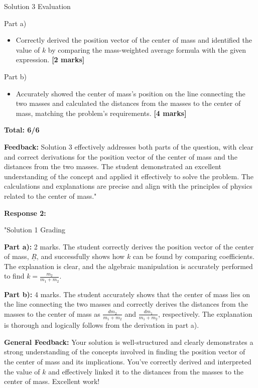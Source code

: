 \documentclass[a4paper,11pt]{article}
\begin{document}
Solution 3 Evaluation

Part a)
\begin{itemize}
    \item Correctly derived the position vector of the center of mass and identified the value of \( k \) by comparing the mass-weighted average formula with the given expression. \textbf{[2 marks]}
\end{itemize}

Part b)
\begin{itemize}
    \item Accurately showed the center of mass's position on the line connecting the two masses and calculated the distances from the masses to the center of mass, matching the problem's requirements. \textbf{[4 marks]}
\end{itemize}

\textbf{Total: 6/6}

\textbf{Feedback:} Solution 3 effectively addresses both parts of the question, with clear and correct derivations for the position vector of the center of mass and the distances from the two masses. The student demonstrated an excellent understanding of the concept and applied it effectively to solve the problem. The calculations and explanations are precise and align with the principles of physics related to the center of mass."

\textbf{Response 2:}

"Solution 1 Grading

\textbf{Part a):} 2 marks. The student correctly derives the position vector of the center of mass, \( \underline{R} \), and successfully shows how \( k \) can be found by comparing coefficients. The explanation is clear, and the algebraic manipulation is accurately performed to find \( k = \frac{m_2}{m_1 + m_2} \).

\textbf{Part b):} 4 marks. The student accurately shows that the center of mass lies on the line connecting the two masses and correctly derives the distances from the masses to the center of mass as \( \frac{d m_2}{m_1 + m_2} \) and \( \frac{d m_1}{m_1 + m_2} \), respectively. The explanation is thorough and logically follows from the derivation in part a).

\textbf{General Feedback:} Your solution is well-structured and clearly demonstrates a strong understanding of the concepts involved in finding the position vector of the center of mass and its implications. You've correctly derived and interpreted the value of \( k \) and effectively linked it to the distances from the masses to the center of mass. Excellent work!
\end{document}
